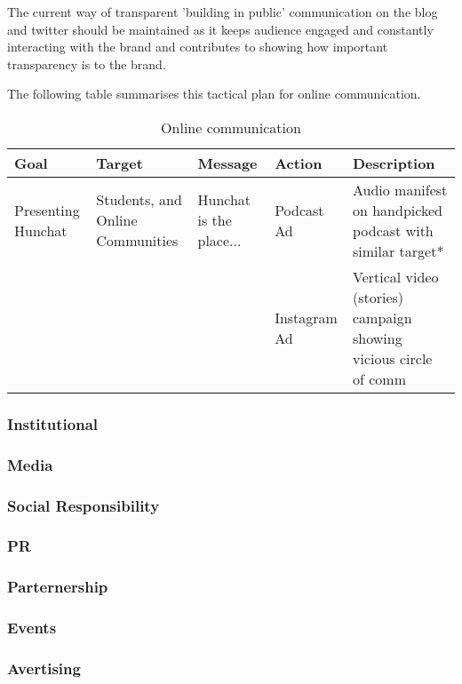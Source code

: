 \documentclass[12pt]{article}
\begin{document}
	
	The current way of transparent 'building in public' communication on the blog and twitter should be maintained as it keeps audience engaged and constantly interacting with the brand and contributes to showing how important transparency is to the brand.
	
	The following table summarises this tactical plan for online communication.
	
	\begin{table}[htb]
	\small
	\caption{Online communication}
	\label{table:online}
	\centering
	\begin{tabular}{ @{}P{0.12\textwidth}P{0.15\textwidth}P{0.18\textwidth}P{0.1\textwidth}P{0.35\textwidth}@{} }
Goal	&	Target	&	Message	&	Action	&	Description	 \\ \hline
Presenting Hunchat	&	Students, and Online Communities 	& Hunchat is the place... & 	Podcast Ad & Audio manifest on handpicked podcast with similar target* \\
	& 	&	& Instagram Ad & Vertical video (stories) campaign showing vicious circle of comm
 	\\ \hline
	\end{tabular}
	\end{table}
	
	
	\subsubsection{Institutional}
	\subsubsection{Media}
	\subsubsection{Social Responsibility}
	\subsubsection{PR}
	\subsubsection{Parternership}
	\subsubsection{Events}
	\subsubsection{Avertising}
\end{document}
